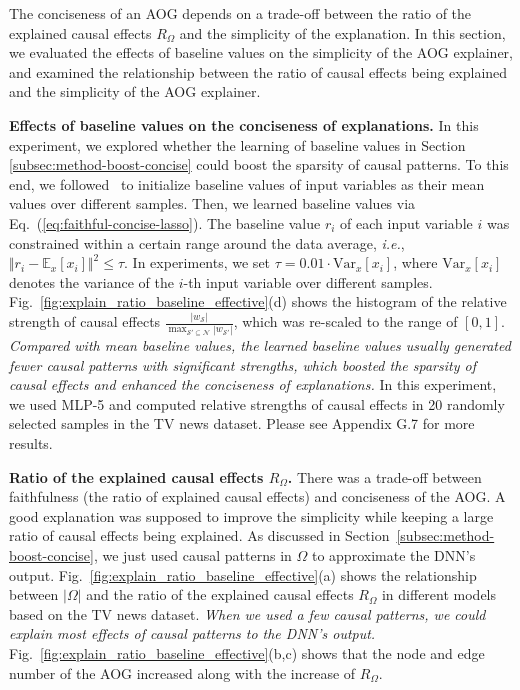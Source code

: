 \documentclass[10pt,twocolumn,letterpaper]{article}
\begin{document}
The conciseness of an AOG depends on a trade-off between the ratio of the explained causal effects {\small$R_\Omega$} and the simplicity of the explanation.
In this section, we evaluated the effects of baseline values on the simplicity of the AOG explainer, and examined the relationship between the ratio of causal effects being explained and the simplicity of the AOG explainer.



\textbf{Effects of baseline values on the conciseness of explanations.}
In this experiment, we explored whether the learning of baseline values in Section \ref{subsec:method-boost-concise} could boost the sparsity of causal patterns.
To this end, we followed~\cite{dabkowski2017real} to initialize baseline values of input variables as their mean values over different samples.
Then, we learned baseline values via Eq.~(\ref{eq:faithful-concise-lasso}).
The baseline value {\small$r_i$} of each input variable {\small$i$} was constrained within a certain range around the data average, \emph{i.e.}, {\small$\Vert r_i-\mathbb{E}_x[x_i]\Vert^2\leq \tau$}. In experiments, we set {\small$\tau\!=\!0.01\!\cdot\! \mathrm{Var}_x[x_i]$}, where {\small$\mathrm{Var}_x[x_i]$} denotes the variance of the {\small$i$}-th input variable over different samples.
Fig.~\ref{fig:explain_ratio_baseline_effective}(d) shows the histogram of the relative strength of causal effects {\small$\frac{|w_{\mathcal{S}}|}{\max_{\mathcal{S}'\subseteq \mathcal{N}}|w_{\mathcal{S}'}|}$}, which was re-scaled to the range of {$[0,1]$}.
\textit{Compared with mean baseline values, the learned baseline values usually generated fewer causal patterns with significant strengths, which boosted the sparsity of causal effects and enhanced the conciseness of explanations.}
In this experiment, we used MLP-5 and computed relative strengths of causal effects in 20 randomly selected samples in the TV news dataset.
Please see Appendix G.7 for more results.


\textbf{Ratio of the explained causal effects {\small$R_\Omega$}.}
There was a trade-off between faithfulness (the ratio of explained causal effects) and conciseness of the AOG.
A good explanation was supposed to improve the simplicity while keeping a large ratio of causal effects being explained.
As discussed in Section~\ref{subsec:method-boost-concise}, we just used causal patterns in {\small$\Omega$} to approximate the DNN's output.
Fig.~\ref{fig:explain_ratio_baseline_effective}(a) shows the relationship between {\small$|\Omega|$} and the ratio of the explained causal effects {\small$R_\Omega$} in different models based on the TV news dataset.
\textit{When we used a few causal patterns, we could explain most effects of causal patterns to the DNN's output.}
Fig.~\ref{fig:explain_ratio_baseline_effective}(b,c) shows that the node and edge number of the AOG increased along with the increase of {\small$R_\Omega$}.
\end{document}
